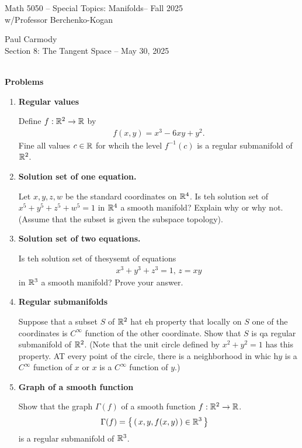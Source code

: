 \documentclass[12pt,a4paper]{report}
\newcommand{\CLASSNAME}{Math 5050 -- Special Topics: Manifolds}
\newcommand{\STUDENTNAME}{Paul Carmody}
\newcommand{\ASSIGNMENT}{Section 8: The Tangent Space }
\newcommand{\DUEDATE}{May 30, 2025}
\newcommand{\PROFESSOR}{Professor Berchenko-Kogan}
\newcommand{\SEMESTER}{Fall 2025}
\begin{document}
\begin{center}
	\Large{\CLASSNAME -- \SEMESTER} \\
	\large{ w/\PROFESSOR}
\end{center}
\begin{center}
	\STUDENTNAME \\
	\ASSIGNMENT -- \DUEDATE\\
\end{center} 


\noindent \textbf{\\\large{Problems}}

\begin{enumerate}[label=9.\arabic*.]

\item \textbf{Regular values}

Define $f:\mathbb{R}^2\to \mathbb{R}$ by
\begin{align*}
	f(x,y) = x^3-6xy+y^2.
\end{align*}Fine all values $c \in \mathbb{R}$ for whcih the level $f^{-1}(c)$ is a regular submanifold of $\mathbb{R}^2$.

\item \textbf{Solution set of one equation.}

Let $x,y,z,w$ be the standard coordinates on $\mathbb{R}^4$.  Is teh solution set of $x^5+y^5+z^5+w^5=1$ in $\mathbb{R}^4$ a smooth manifold?  Explain why or why not.  (Assume that the subset is given the subspace topology).

\item \textbf{Solution set of two equations.}

Is teh solution set of thesysemt of equations 
\begin{align*}
	x^3+y^3+z^3=1,\, z=xy
\end{align*}in $\mathbb{R}^3$ a smooth manifold?  Prove your answer.

\item \textbf{Regular submanifolds}

Suppose that a subset $S$ of $\mathbb{R}^2$ hat eh property that locally on $S$ one of the coordinates is $C^\infty$ function of the other coordinate.  Show that $S$ is qa regular submanifold of $\mathbb{R}^2$. (Note that the unit circle defined by $x^2+y^2=1$ has this property. AT every point of the circle, there is a neighborhood in whic h$y$ is a $C^\infty$ function of $x$ or $x$ is a $C^\infty$ function of $y$.)

\item \textbf{Graph of a smooth function}

Show that the graph $\Gamma(f)$ of a smooth function $f: \mathbb{R}^2\to \mathbb{R}$.
\begin{align*}
	\Gamma(f) &= \left \{\, \left (\, x,y,f(x,y) \,\right ) \in \mathbb{R}^3 \,\right \}
\end{align*}is a regular submanifold of $\mathbb{R}^3$.


\end{enumerate}
\end{document}

